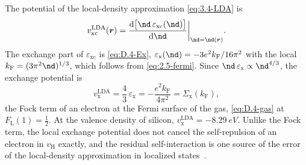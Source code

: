 The potential of the local-density approximation \cref{eq:3.4-LDA} is
\begin{equation*}
  v_{\mathrm{xc}}^{\mathrm{LDA}}(\vect{r}) = \frac{\dd\bigl[\nd\,\varepsilon_{\mathrm{xc}}(\nd)\bigr]}{\dd\nd}\bigg|_{\nd = \nd(\vect{r})} .
\end{equation*}
The exchange part of $\varepsilon_{\mathrm{xc}}$ is \cref{eq:D.4-Ex}, $\varepsilon_{\mathrm{x}}(\nd) = -3e^2k_{\mathrm{F}}/16\pi^2$ with the local $k_{\mathrm{F}} = (3\pi^2\nd)^{1/3}$, which follows from \cref{eq:2.5-fermi}. Since $\nd\,\varepsilon_{\mathrm{x}} \propto \nd^{4/3}$, the exchange potential is
\begin{equation*}
  v_{\mathrm{x}}^{\mathrm{LDA}} = \frac43\,\varepsilon_{\mathrm{x}} = -\frac{e^2k_{\mathrm{F}}}{4\pi^2} = \Sigma_{\mathrm{x}}(k_{\mathrm{F}}) ,
\end{equation*}
the Fock term of an electron at the Fermi surface of the gas, \cref{eq:D.4-gas} at $F_{\mathrm{L}}(1) = \tfrac12$. At the valence density of silicon, $v_{\mathrm{x}}^{\mathrm{LDA}} = \SI{-8.29}{eV}$. Unlike the Fock term, the local exchange potential does not cancel the self-repulsion of an electron in $v_{\mathrm{H}}$ exactly, and the residual self-interaction is one source of the error of the local-density approximation in localized states~\cite{perdew1981self}.

